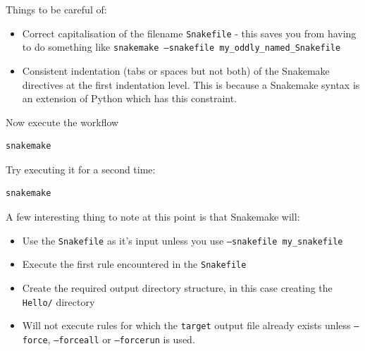 \begin{note}

Things to be careful of:

\begin{itemize}
  \item Correct capitalisation of the filename \texttt{Snakefile} - this saves you from having to do something like \texttt{snakemake --snakefile my\_oddly\_named\_Snakefile}
  \item Consistent indentation (tabs or spaces but not both) of the Snakemake directives at the first indentation level. This is because a Snakemake syntax is
        an extension of Python which has this constraint.
\end{itemize}

\end{note}

\begin{steps}

Now execute the workflow

\begin{lstlisting}
snakemake
\end{lstlisting}

Try executing it for a second time:

\begin{lstlisting}
snakemake
\end{lstlisting}

\end{steps}

\begin{note}

A few interesting thing to note at this point is that Snakemake will:

\begin{itemize}
  \item Use the \texttt{Snakefile} as it's input unless you use \texttt{--snakefile my\_snakefile}
  \item Execute the first rule encountered in the \texttt{Snakefile}
  \item Create the required output directory structure, in this case creating the \texttt{Hello/} directory
  \item Will not execute rules for which the \texttt{target} output file already exists unless \texttt{--force}, \texttt{--forceall} or \texttt{--forcerun} is used.
\end{itemize}

\end{note}


